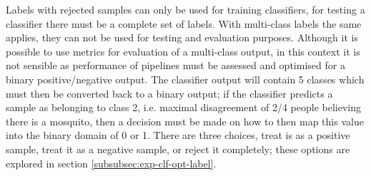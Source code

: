         
        Labels with rejected samples can only be used for training classifiers, for testing a classifier there must be a complete set of labels. With multi-class labels the same applies, they can not be used for testing and evaluation purposes. Although it is possible to use metrics for evaluation of a multi-class output, in this context it is not sensible as performance of pipelines must be assessed and optimised for a binary positive/negative output. The classifier output will contain 5 classes which must then be converted back to a binary output; if the classifier predicts a sample as belonging to class 2, i.e. maximal disagreement of 2/4 people believing there is a mosquito, then a decision must be made on how to then map this value into the binary domain of 0 or 1. There are three choices, treat is as a positive sample, treat it as a negative sample, or reject it completely; these options are explored in section \ref{subsubsec:exp-clf-opt-label}. 